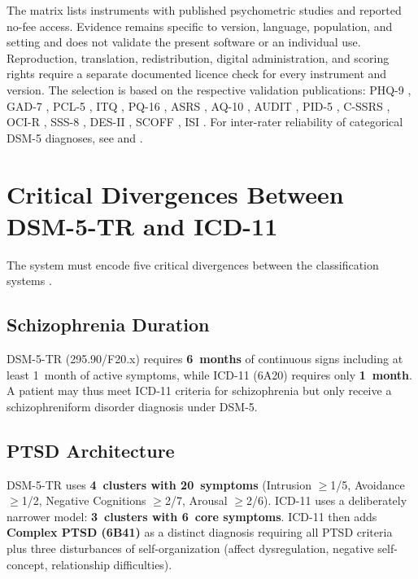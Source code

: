 \documentclass[11pt,a4paper]{article}
\begin{document}
The matrix lists instruments with published psychometric studies and reported no-fee access. Evidence remains specific to version, language, population, and setting and does not validate the present software or an individual use. Reproduction, translation, redistribution, digital administration, and scoring rights require a separate documented licence check for every instrument and version. The selection is based on the respective validation publications: PHQ-9 \citep{Levis2019}, GAD-7 \citep{Spitzer2006}, PCL-5 \citep{Blevins2015}, ITQ \citep{Cloitre2018}, PQ-16 \citep{Ising2012}, ASRS \citep{Kessler2005}, AQ-10 \citep{Allison2012}, AUDIT \citep{Saunders1993}, PID-5 \citep{OltmannsWidiger2018, Riegel2021}, C-SSRS \citep{Posner2011}, OCI-R \citep{Foa2002}, SSS-8 \citep{Gierk2014}, DES-II \citep{CarlsonPutnam1993}, SCOFF \citep{Morgan1999}, ISI \citep{Morin2011}. For inter-rater reliability of categorical DSM-5 diagnoses, see \citet{Regier2013} and \citet{Aboraya2006}.

\section{Critical Divergences Between DSM-5-TR and ICD-11}
\label{sec:divergences}

The system must encode five critical divergences between the classification systems \citep{Keeley2016}.

\subsection{Schizophrenia Duration}

DSM-5-TR (295.90/F20.x) requires \textbf{6~months} of continuous signs including at least 1~month of active symptoms, while ICD-11 (6A20) requires only \textbf{1~month}. A patient may thus meet ICD-11 criteria for schizophrenia but only receive a schizophreniform disorder diagnosis under DSM-5.

\subsection{PTSD Architecture}

DSM-5-TR uses \textbf{4~clusters with 20~symptoms} (Intrusion $\geq$1/5, Avoidance $\geq$1/2, Negative Cognitions $\geq$2/7, Arousal $\geq$2/6). ICD-11 uses a deliberately narrower model: \textbf{3~clusters with 6~core symptoms}. ICD-11 then adds \textbf{Complex PTSD (6B41)} as a distinct diagnosis requiring all PTSD criteria plus three disturbances of self-organization (affect dysregulation, negative self-concept, relationship difficulties).
\end{document}
